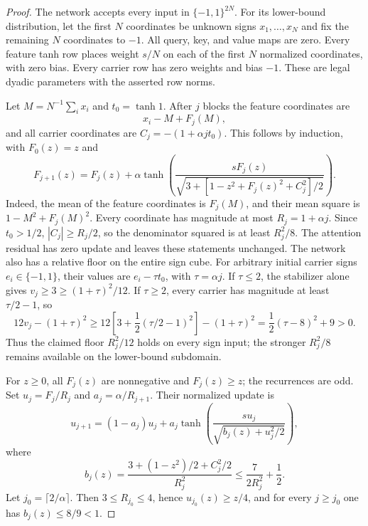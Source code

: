 \begin{proof}
The network accepts every input in $\{-1,1\}^{2N}$. For its lower-bound
distribution, let the first $N$ coordinates be unknown signs
$x_1,\ldots,x_N$ and fix the remaining $N$ coordinates to $-1$. All query, key, and value maps are zero. Every feature tanh row
places weight $s/N$ on each of the first $N$ normalized coordinates,
with zero bias. Every carrier row has zero weights and bias $-1$.
These are legal dyadic parameters with the asserted row norms.

Let $M=N^{-1}\sum_i x_i$ and $t_0=\tanh1$. After $j$ blocks the feature
coordinates are
\[
 x_i-M+F_j(M),
\]
and all carrier coordinates are $C_j=-(1+\alpha jt_0)$. This follows
by induction, with $F_0(z)=z$ and
\begin{equation}
 F_{j+1}(z)=F_j(z)+\alpha
 \tanh\!\left(
 \frac{sF_j(z)}{
  \sqrt{3+[1-z^2+F_j(z)^2+C_j^2]/2}}
 \right).
 \label{eq:pn-scaled-meanrec}
\end{equation}
Indeed, the mean of the feature coordinates is $F_j(M)$, and their
mean square is $1-M^2+F_j(M)^2$. Every coordinate has magnitude at
most $R_j=1+\alpha j$. Since $t_0>1/2$,
$|C_j|\ge R_j/2$, so the denominator squared is at least $R_j^2/8$.
The attention residual has zero update and leaves these statements
unchanged. The network also has a relative floor on the entire sign cube.
For arbitrary initial carrier signs $e_i\in\{-1,1\}$, their values are
$e_i-\tau t_0$, with $\tau=\alpha j$. If $\tau\le2$, the stabilizer alone
gives $v_j\ge3\ge(1+\tau)^2/12$. If $\tau\ge2$, every carrier has
magnitude at least $\tau/2-1$, so
\[
 12v_j-(1+\tau)^2
 \ge12\left[3+\frac12(\tau/2-1)^2\right]-(1+\tau)^2
 =\frac12(\tau-8)^2+9>0.
\]
Thus the claimed floor $R_j^2/12$ holds on every sign input; the stronger
$R_j^2/8$ remains available on the lower-bound subdomain.

For $z\ge0$, all $F_j(z)$ are nonnegative and $F_j(z)\ge z$; the
recurrences are odd. Set $u_j=F_j/R_j$ and
$a_j=\alpha/R_{j+1}$. Their normalized update is
\[
 u_{j+1}=(1-a_j)u_j+
 a_j\tanh\!\left(\frac{s u_j}{\sqrt{b_j(z)+u_j^2/2}}\right),
\]
where
\[
 b_j(z)=\frac{3+(1-z^2)/2+C_j^2/2}{R_j^2}
 \le\frac{7}{2R_j^2}+\frac12.
\]
Let $j_0=\lceil2/\alpha\rceil$. Then $3\le R_{j_0}\le4$, hence
$u_{j_0}(z)\ge z/4$, and for every $j\ge j_0$ one has
$b_j(z)\le8/9<1$.


\end{proof}
